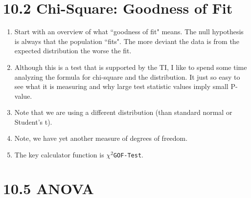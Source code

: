 \documentclass{article}
\begin{document}
\section*{10.2 Chi-Square: Goodness of Fit}

\begin{enumerate}

  \item Start with an overview of what ``goodness of fit" means. The null hypothesis is always that the population ``fits". The more deviant the data is from the expected distribution the worse the fit.
  
  \item Although this is a test that is supported by the TI, I like to spend some time analyzing the formula for chi-square and the distribution. It just so easy to see what it is measuring and why large test statistic values imply small P-value.
  
  \item Note that we are using a different distribution (than standard normal or Student’s t).
  
  \item Note, we have yet another measure of degrees of freedom.
  
  \item The key calculator function is $\chi^2$\texttt{GOF-Test}.
  
\end{enumerate}

\section*{10.5 ANOVA}
\end{document}
